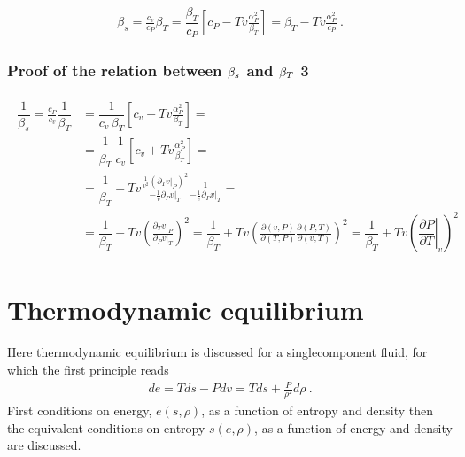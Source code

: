 \documentclass[letterpaper,10pt,english]{jupyterBook}
\begin{document}
\begin{equation*}
\begin{split}
\beta_s = \frac{c_v}{c_P} \beta_T 
  = \dfrac{\beta_T}{c_P} \left[ c_P - T v \frac{\alpha^2_P}{\beta_T} \right]
  = \beta_T - T v \frac{\alpha^2_P}{c_P} \ .
\end{split}
\end{equation*}\subsubsection*{Proof of the relation between \protect\(\beta_s\protect\) and \protect\(\beta_T\protect\) \sphinxhyphen{} 3}
\begin{equation*}
\begin{split}\begin{aligned}
\dfrac{1}{\beta_s} = \frac{c_P}{c_v} \dfrac{1}{\beta_T}
  & = \dfrac{1}{c_v \, \beta_T} \left[ c_v + T v \frac{\alpha^2_P}{\beta_T} \right] = \\
  & = \dfrac{1}{\beta_T} \, \dfrac{1}{c_v} \left[ c_v + T v \frac{\alpha^2_P}{\beta_T} \right] = \\
  & = \dfrac{1}{\beta_T} + T v \frac{\frac{1}{v^2} (\partial_T v|_P)^2}{-\frac{1}{v} \partial_P v|_T} \frac{1}{-\frac{1}{v} \partial_P v|_T} = \\
  & = \dfrac{1}{\beta_T} + T v \left( \frac{\partial_T v|_P}{\partial_P v|_T} \right)^2
    = \dfrac{1}{\beta_T} + T v \left( \frac{\partial (v,P)}{\partial (T,P)} \frac{\partial (P,T)}{\partial (v,T)} \right)^2 = \dfrac{1}{\beta_T} + T v \left( \left.\dfrac{\partial P}{\partial T}\right|_v  \right)^2
\end{aligned}\end{split}
\end{equation*}

\section{Thermodynamic equilibrium}
\label{\detokenize{ch/coefficients:thermodynamic-equilibrium}}
\sphinxAtStartPar
Here thermodynamic equilibrium is discussed for a single\sphinxhyphen{}component fluid, for which the first principle reads
\begin{equation*}
\begin{split}d e = T ds - P dv = T ds + \frac{P}{\rho^2} d \rho \ .\end{split}
\end{equation*}
\sphinxAtStartPar
First conditions on energy, \(e(s, \rho)\), as a function of entropy and density then the equivalent conditions on entropy \(s(e, \rho)\), as a function of energy and density are discussed.
\end{document}
